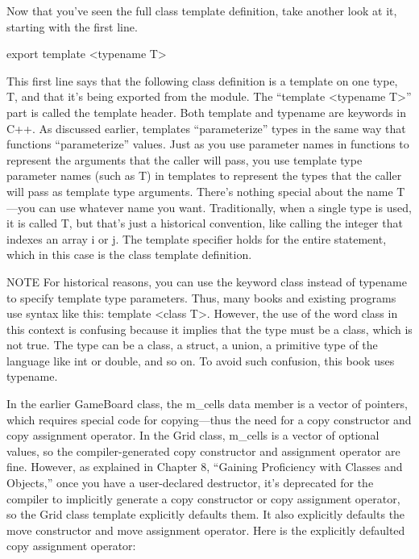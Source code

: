 Now that you’ve seen the full class template definition, take another look at it, starting with the first line.

\begin{cpp}
export template <typename T>
\end{cpp}

This first line says that the following class definition is a template on one type, T, and that it’s being exported from the module. The “template <typename T>” part is called the template header. Both template and typename are keywords in C++. As discussed earlier, templates “parameterize” types in the same way that functions “parameterize” values. Just as you use parameter names in functions to represent the arguments that the caller will pass, you use template type parameter names (such as T) in templates to represent the types that the caller will pass as template type arguments. There’s nothing special about the name T—you can use whatever name you want. Traditionally, when a single type is used, it is called T, but that’s just a historical convention, like calling the integer that indexes an array i or j. The template specifier holds for the entire statement, which in this case is the class template definition.

\begin{myNotic}{NOTE}
For historical reasons, you can use the keyword class instead of typename to specify template type parameters. Thus, many books and existing programs use syntax like this: template <class T>. However, the use of the word class in this context is confusing because it implies that the type must be a class, which is not true. The type can be a class, a struct, a union, a primitive type of the language like int or double, and so on. To avoid such confusion, this book uses typename.
\end{myNotic}

In the earlier GameBoard class, the m\_cells data member is a vector of pointers, which requires special code for copying—thus the need for a copy constructor and copy assignment operator. In the Grid class, m\_cells is a vector of optional values, so the compiler-generated copy constructor and assignment operator are fine. However, as explained in Chapter 8, “Gaining Proficiency with Classes and Objects,” once you have a user-declared destructor, it’s deprecated for the compiler to implicitly generate a copy constructor or copy assignment operator, so the Grid class template explicitly defaults them. It also explicitly defaults the move constructor and move assignment operator. Here is the explicitly defaulted copy assignment operator:

